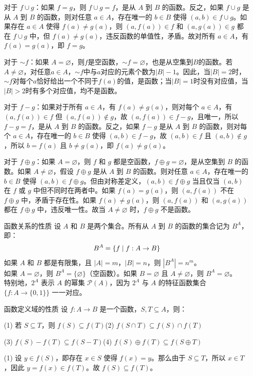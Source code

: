 \documentclass[lang=cn,11pt]{elegantbook}
\begin{document}
对于 $f \cup g$：如果 $f = g$，则 $f \cup g = f$，是从 $A$ 到 $B$ 的函数。反之，如果 $f \cup g$ 是从 $A$ 到 $B$ 的函数，则对任意 $a \in A$，存在唯一的 $b \in B$ 使得 $(a, b) \in f \cup g$。如果存在 $a \in A$ 使得 $f(a) \neq g(a)$，则 $(a, f(a)) \in f$ 和 $(a, g(a)) \in g$ 都在 $f \cup g$ 中，但 $f(a) \neq g(a)$，违反函数的单值性，矛盾。故对所有 $a \in A$，有 $f(a) = g(a)$，即 $f = g$。

对于 $\sim f$：如果 $A = \varnothing$，则$f$是空函数，$\sim f=\varnothing$，也是从空集到$B$的函数。若$A\neq\varnothing$，对任意$a\in A$，$\sim f$中与$a$对应的元素个数为$|B|-1$。因此，当$|B|=2$时，$\sim f$对每个$a$恰好给出一个不同于$f(a)$的值，是函数；当$|B|=1$时没有对应值，当$|B|>2$时有多个对应值，均不是函数。

对于 $f - g$：如果对于所有 $a \in A$，有 $f(a) \neq g(a)$，则对每个 $a \in A$，有 $(a, f(a)) \in f$ 但 $(a, f(a)) \notin g$，故 $(a, f(a)) \in f - g$，且唯一，所以 $f - g = f$，是从 $A$ 到 $B$ 的函数。反之，如果 $f - g$ 是从 $A$ 到 $B$ 的函数，则对每个 $a \in A$，存在唯一的 $b \in B$ 使得 $(a, b) \in f - g$，故 $(a, b) \in f$ 且 $(a, b) \notin g$，所以 $b = f(a)$ 且 $b \neq g(a)$，即 $f(a) \neq g(a)$。

对于 $f \oplus g$：如果 $A = \varnothing$，则 $f$ 和 $g$ 都是空函数，$f \oplus g = \varnothing$，是从空集到 $B$ 的函数。如果 $A \neq \varnothing$，假设 $f \oplus g$ 是从 $A$ 到 $B$ 的函数。则对任意 $a \in A$，存在唯一的 $b \in B$ 使得 $(a, b) \in f \oplus g$。但由对称差定义，$(a, b) \in f \oplus g$ 当且仅当 $(a, b)$ 在 $f$ 或 $g$ 中但不同时在两者中。如果 $f(a) = g(a)$，则 $(a, f(a))$ 不在 $f \oplus g$ 中，矛盾于存在性。如果 $f(a) \neq g(a)$，则 $(a, f(a))$ 和 $(a, g(a))$ 都在 $f \oplus g$ 中，违反唯一性。故当 $A \neq \varnothing$ 时，$f \oplus g$ 不是函数。

\begin{theorem}{函数关系的性质}
设 $A$ 和 $B$ 是两个集合。所有从 $A$ 到 $B$ 的函数的集合记为 $B^A$，即：\vspace{-5pt}
\[
B^A = \{f \mid f: A \to B\}\vspace{-5pt}
\]
如果 $A$ 和 $B$ 都是有限集，且 $|A| = m$，$|B| = n$，则 $|B^A| = n^m$。\\
如果 $A = \varnothing$，则 $B^A = \{\varnothing\}$（空函数）。如果 $B = \varnothing$ 且 $A \neq \varnothing$，则 $B^A = \varnothing$。\\
特别地，$2^A$ 表示 $A$ 的幂集 $\mathcal{P}(A)$，因为 $2^A$ 与 $A$ 的特征函数集合 $\{f: A \to \{0,1\}\}$ 一一对应。
\end{theorem}
\begin{theorem}{函数定义域的性质}
设 $f: A \to B$ 是一个函数，$S, T \subseteq A$，则：

(1) 若 $S \subseteq T$，则 $f(S) \subseteq f(T)$\quad (2) $f(S \cap T) \subseteq f(S) \cap f(T)$

(3) $f(S) - f(T) \subseteq f(S - T)$\quad (4) $f(S) \oplus f(T) \subseteq f(S \oplus T)$
\end{theorem}
(1) 设 $y \in f(S)$，即存在 $x \in S$ 使得 $f(x) = y$。那么由于 $S \subseteq T$，所以 $x \in T$，因此 $y = f(x) \in f(T)$。故 $f(S) \subseteq f(T)$。
\end{document}
